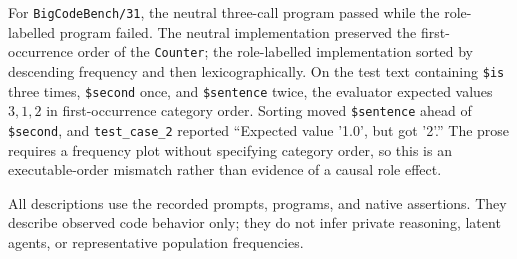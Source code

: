 For \texttt{BigCodeBench/31}, the neutral three-call program passed while the role-labelled program failed. The neutral implementation preserved the first-occurrence order of the \texttt{Counter}; the role-labelled implementation sorted by descending frequency and then lexicographically. On the test text containing \texttt{\$is} three times, \texttt{\$second} once, and \texttt{\$sentence} twice, the evaluator expected values $3,1,2$ in first-occurrence category order. Sorting moved \texttt{\$sentence} ahead of \texttt{\$second}, and \texttt{test\_case\_2} reported ``Expected value '1.0', but got '2'.'' The prose requires a frequency plot without specifying category order, so this is an executable-order mismatch rather than evidence of a causal role effect.

All descriptions use the recorded prompts, programs, and native assertions. They describe observed code behavior only; they do not infer private reasoning, latent agents, or representative population frequencies.

